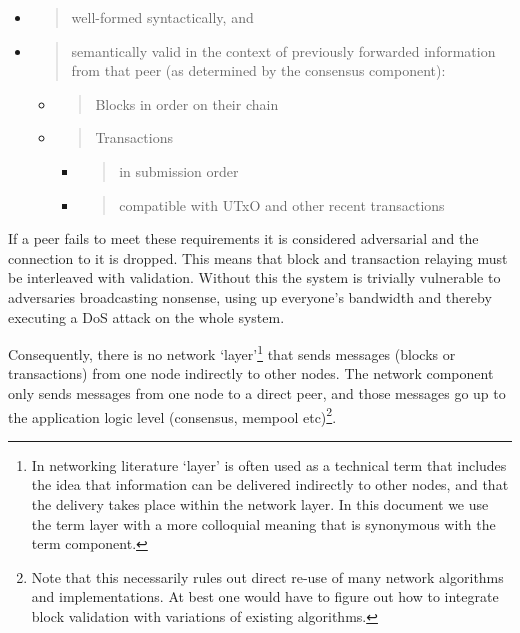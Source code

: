 \documentclass[]{article}
\begin{document}
\begin{itemize}
\item
  \begin{quote}
  well-formed syntactically, and
  \end{quote}
\item
  \begin{quote}
  semantically valid in the context of previously forwarded information
  from that peer (as determined by the consensus component):
  \end{quote}

  \begin{itemize}
  \item
    \begin{quote}
    Blocks in order on their chain
    \end{quote}
  \item
    \begin{quote}
    Transactions
    \end{quote}

    \begin{itemize}
    \item
      \begin{quote}
      in submission order
      \end{quote}
    \item
      \begin{quote}
      compatible with UTxO and other recent transactions
      \end{quote}
    \end{itemize}
  \end{itemize}
\end{itemize}

If a peer fails to meet these requirements it is considered adversarial
and the connection to it is dropped. This means that block and
transaction relaying must be interleaved with validation. Without this
the system is trivially vulnerable to adversaries broadcasting nonsense,
using up everyone's bandwidth and thereby executing a DoS attack on the
whole system.

Consequently, there is no network `layer'\footnote{In networking
  literature `layer' is often used as a technical term that includes the
  idea that information can be delivered indirectly to other nodes, and
  that the delivery takes place within the network layer. In this
  document we use the term layer with a more colloquial meaning that is
  synonymous with the term component.} that sends messages (blocks or
transactions) from one node indirectly to other nodes. The network
component only sends messages from one node to a direct peer, and those
messages go up to the application logic level (consensus, mempool
etc)\footnote{Note that this necessarily rules out direct re-use of many
  network algorithms and implementations. At best one would have to
  figure out how to integrate block validation with variations of
  existing algorithms.}.
\end{document}
